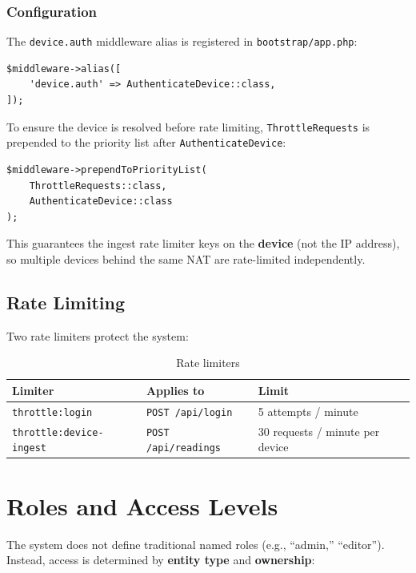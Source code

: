 \documentclass[11pt,a4paper]{article}
\begin{document}
\subsubsection{Configuration}

The \texttt{device.auth} middleware alias is registered in \texttt{bootstrap/app.php}:

\begin{lstlisting}[caption=Middleware alias registration]
$middleware->alias([
    'device.auth' => AuthenticateDevice::class,
]);
\end{lstlisting}

To ensure the device is resolved before rate limiting, \texttt{ThrottleRequests} is prepended to the priority list after \texttt{AuthenticateDevice}:

\begin{lstlisting}[caption=Middleware priority ordering]
$middleware->prependToPriorityList(
    ThrottleRequests::class,
    AuthenticateDevice::class
);
\end{lstlisting}

This guarantees the ingest rate limiter keys on the \textbf{device} (not the IP address), so multiple devices behind the same NAT are rate-limited independently.

\subsection{Rate Limiting}

Two rate limiters protect the system:

\begin{table}[h]
\centering
\small
\begin{tabular}{lll}
\toprule
\textbf{Limiter} & \textbf{Applies to} & \textbf{Limit} \\
\midrule
\texttt{throttle:login} & \texttt{POST /api/login} & 5 attempts / minute \\
\texttt{throttle:device-ingest} & \texttt{POST /api/readings} & 30 requests / minute per device \\
\bottomrule
\end{tabular}
\caption{Rate limiters}
\end{table}

\section{Roles and Access Levels}

The system does not define traditional named roles (e.g., ``admin,'' ``editor''). Instead, access is determined by \textbf{entity type} and \textbf{ownership}:
\end{document}
